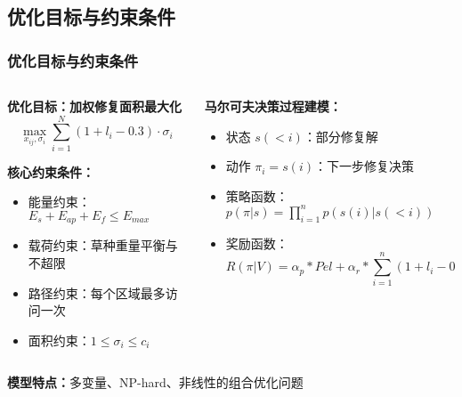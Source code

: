 \documentclass[11pt, aspectratio=169]{beamer}  %
\begin{document}
\subsection{优化目标与约束条件}
\begin{frame}
	\frametitle{优化目标与约束条件}
	\begin{columns}
		\begin{column}{0.5\textwidth}
			\textbf{优化目标：加权修复面积最大化}
			\begin{equation*}
				\max_{x_{ij}, \sigma_i} \sum_{i=1}^{N} (1+ l_i - 0.3) \cdot \sigma_i
			\end{equation*}

			\textbf{核心约束条件：}
			\begin{itemize}
				\item 能量约束：$E_s + E_{ap} + E_f \leq E_{max}$
				\item 载荷约束：草种重量平衡与不超限
				\item 路径约束：每个区域最多访问一次
				\item 面积约束：$1 \leq \sigma_i \leq c_i$
			\end{itemize}
		\end{column}
		\begin{column}{0.5\textwidth}
			\textbf{马尔可夫决策过程建模：}
			\begin{itemize}
				\item 状态 $s(<i)$：部分修复解
				\item 动作 $\pi_i=s(i)$：下一步修复决策
				\item 策略函数：$p(\pi|s)=\prod_{i=1}^n p(s(i)|s(<i))$
				\item 奖励函数：
				      \begin{equation*}
					      R(\pi|V)=\alpha_{p}*Pel+\alpha_{r}*\sum_{i=1}^{n}(1 + l_i - 0.3)*a_{i}
				      \end{equation*}
			\end{itemize}
		\end{column}
	\end{columns}
	\vspace{0.3cm}
	\textbf{模型特点：}多变量、NP-hard、非线性的组合优化问题
\end{frame}
\end{document}
